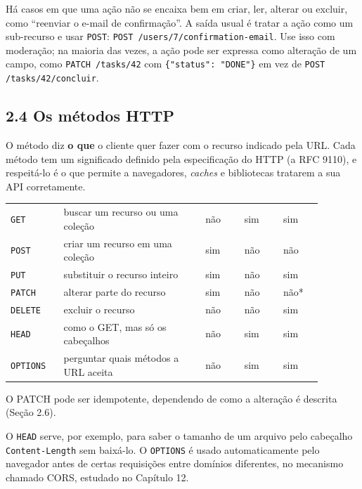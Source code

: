 Há casos em que uma ação não se encaixa bem em criar, ler, alterar ou excluir, como ``reenviar o e-mail de confirmação''. A saída usual é tratar a ação como um sub-recurso e usar \texttt{POST}: \texttt{POST /users/7/confirmation-email}. Use isso com moderação; na maioria das vezes, a ação pode ser expressa como alteração de um campo, como \texttt{PATCH /tasks/42} com \texttt{\{"status": "DONE"\}} em vez de \texttt{POST /tasks/42/concluir}.

\subsection{2.4 Os métodos HTTP}

O método diz \textbf{o que} o cliente quer fazer com o recurso indicado pela URL. Cada método tem um significado definido pela especificação do HTTP (a RFC 9110), e respeitá-lo é o que permite a navegadores, \textit{caches} e bibliotecas tratarem a sua API corretamente.

\begin{center}
\begin{tabular}{@{}P{0.15\linewidth}P{0.4\linewidth}P{0.11\linewidth}P{0.11\linewidth}P{0.11\linewidth}@{}}
\toprule
{}
 &  &  &  &  \\
\midrule
\texttt{GET} & buscar um recurso ou uma coleção & não & sim & sim \\
 \texttt{POST} & criar um recurso em uma coleção & sim & não & não \\
\texttt{PUT} & substituir o recurso inteiro & sim & não & sim \\
 \texttt{PATCH} & alterar parte do recurso & sim & não & não* \\
\texttt{DELETE} & excluir o recurso & não & não & sim \\
 \texttt{HEAD} & como o GET, mas só os cabeçalhos & não & sim & sim \\
\texttt{OPTIONS} & perguntar quais métodos a URL aceita & não & sim & sim \\
\bottomrule
\end{tabular}
\end{center}

{\footnotesize * O PATCH pode ser idempotente, dependendo de como a alteração é descrita (Seção 2.6).}

O \texttt{HEAD} serve, por exemplo, para saber o tamanho de um arquivo pelo cabeçalho \texttt{Content-Length} sem baixá-lo. O \texttt{OPTIONS} é usado automaticamente pelo navegador antes de certas requisições entre domínios diferentes, no mecanismo chamado CORS, estudado no Capítulo 12.

